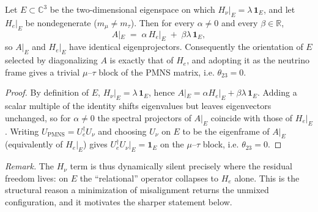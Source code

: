 
\begin{lemma}
\label{lem:inertness}
Let $E\subset\mathbb{C}^3$ be the two-dimensional eigenspace on which
$H_\nu|_E=\lambda\,\mathbf 1_E$, and let $H_e|_E$ be nondegenerate
($m_\mu\neq m_\tau$). Then for every $\alpha\neq0$ and every $\beta\in\mathbb R$,
\[
  A|_E \;=\; \alpha\,H_e|_E \;+\; \beta\lambda\,\mathbf 1_E ,
\]
so $A|_E$ and $H_e|_E$ have identical eigenprojectors. Consequently the
orientation of $E$ selected by diagonalizing $A$ is exactly that of $H_e$, and
adopting it as the neutrino frame gives a trivial $\mu$--$\tau$ block of the
PMNS matrix, i.e. $\theta_{23}=0$.
\end{lemma}

\begin{proof}
By definition of $E$, $H_\nu|_E=\lambda\,\mathbf 1_E$, hence
$A|_E=\alpha H_e|_E+\beta\lambda\,\mathbf 1_E$. Adding a scalar multiple of the
identity shifts eigenvalues but leaves eigenvectors unchanged, so for
$\alpha\neq0$ the spectral projectors of $A|_E$ coincide with those of
$H_e|_E$. Writing $U_{\mathrm{PMNS}}=U_e^\dagger U_\nu$ and choosing $U_\nu$ on
$E$ to be the eigenframe of $A|_E$ (equivalently of $H_e|_E$) gives
$U_e^\dagger U_\nu|_E=\mathbf 1_E$ on the $\mu$--$\tau$ block, i.e.
$\theta_{23}=0$.
\end{proof}

\noindent\emph{Remark.} The $H_\nu$ term is thus dynamically silent precisely
where the residual freedom lives: on $E$ the ``relational'' operator collapses
to $H_e$ alone. This is the structural reason a minimization of misalignment
returns the unmixed configuration, and it motivates the sharper statement
below.



